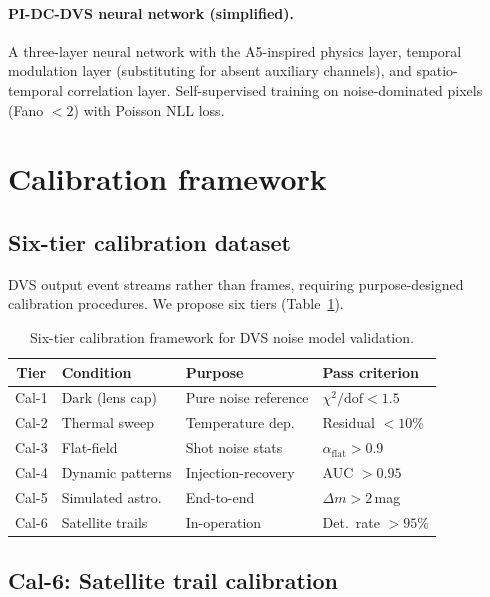\documentclass[twocolumn]{article}
\begin{document}
\paragraph{PI-DC-DVS neural network (simplified).}
A three-layer neural network with the A5-inspired physics layer, temporal modulation layer (substituting for absent auxiliary channels), and spatio-temporal correlation layer.
Self-supervised training on noise-dominated pixels (Fano $< 2$) with Poisson NLL loss.


\section{Calibration framework}
\label{sec:calibration}

\subsection{Six-tier calibration dataset}

DVS output event streams rather than frames, requiring purpose-designed calibration procedures.
We propose six tiers (Table~\ref{tab:calibration}).

\begin{table}[htbp]
\centering
\caption{Six-tier calibration framework for DVS noise model validation.}
\label{tab:calibration}
\begin{tabular}{@{}clll@{}}
\toprule
Tier & Condition & Purpose & Pass criterion \\
\midrule
Cal-1 & Dark (lens cap) & Pure noise reference & $\chi^2/\mathrm{dof} < 1.5$ \\
Cal-2 & Thermal sweep & Temperature dep. & Residual $< 10$\% \\
Cal-3 & Flat-field & Shot noise stats & $\alpha_\mathrm{flat} > 0.9$ \\
Cal-4 & Dynamic patterns & Injection-recovery & AUC $> 0.95$ \\
Cal-5 & Simulated astro. & End-to-end & $\Delta m > 2$\,mag \\
Cal-6 & Satellite trails & In-operation & Det.\ rate $>95$\% \\
\bottomrule
\end{tabular}
\end{table}

\subsection{Cal-6: Satellite trail calibration}
\end{document}
